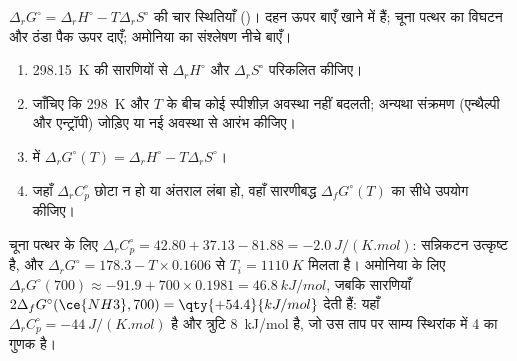 \begin{omfigure}

{\small $\Delta_r G^\circ = \Delta_r H^\circ - T\Delta_r
S^\circ$ की चार स्थितियाँ ()। दहन ऊपर बाएँ खाने में हैं;
चूना पत्थर का विघटन और ठंडा पैक ऊपर दाएँ; अमोनिया का
संश्लेषण नीचे बाएँ।}
\end{omfigure}

\begin{method}[ताप $T$ पर मानक अभिक्रिया गिब्स ऊर्जा]\label{met:b2:reaction-free-energy:delta-g-standard}
\begin{enumerate}
  \item \qty{298.15}{K} की सारणियों से $\Delta_r H^\circ$ और
        $\Delta_r S^\circ$ परिकलित कीजिए।
  \item जाँचिए कि \qty{298}{K} और $T$ के बीच कोई स्पीशीज़ अवस्था नहीं बदलती;
        अन्यथा संक्रमण (एन्थैल्पी और एन्ट्रॉपी) जोड़िए या नई अवस्था से
        आरंभ कीजिए।
  \item {} में $\Delta_r G^\circ(T) = \Delta_r H^\circ
        - T\Delta_r S^\circ$।
  \item जहाँ $\Delta_r C^\circ_p$ छोटा न हो या अंतराल लंबा हो, वहाँ
        सारणीबद्ध $\Delta_f G^\circ(T)$ का सीधे उपयोग कीजिए।
\end{enumerate}
\end{method}

\begin{example}[सन्निकटन की दो परीक्षाएँ]\label{ex:b2:reaction-free-energy:tests}
चूना पत्थर के लिए $\Delta_r C^\circ_p = 42.80 + 37.13 - 81.88 =
\qty{-2.0}{J/(K.mol)}$: सन्निकटन उत्कृष्ट है, और $\Delta_r
G^\circ = 178.3 - T \times 0.1606$ से $T_i = \qty{1110}{K}$ मिलता है। अमोनिया के लिए
$\Delta_r G^\circ(700) \approx -91.9 + 700 \times 0.1981 =
\qty{+46.8}{kJ/mol}$, जबकि सारणियाँ $2\Delta_f G^\circ(\ce{NH3}, 700) =
\qty{+54.4}{kJ/mol}$ देती हैं: यहाँ $\Delta_r C^\circ_p = \qty{-44}{J/(K.mol)}$ है और
त्रुटि \qty{8}{kJ/mol} है, जो उस ताप पर साम्य स्थिरांक में 4 का
गुणक है।
\end{example}

